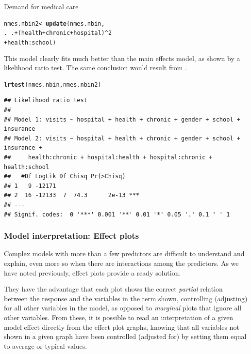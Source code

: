 \documentclass[11pt]{book}\usepackage[]{graphicx}\usepackage[]{color}
\makeatletter
\newcommand{\hlnum}[1]{\textcolor[rgb]{0.686,0.059,0.569}{#1}}%
\newcommand{\hlopt}[1]{\textcolor[rgb]{0,0,0}{#1}}%
\newcommand{\hlstd}[1]{\textcolor[rgb]{0.345,0.345,0.345}{#1}}%
\newcommand{\hlkwb}[1]{\textcolor[rgb]{0.69,0.353,0.396}{#1}}%
\newcommand{\hlkwd}[1]{\textcolor[rgb]{0.737,0.353,0.396}{\textbf{#1}}}%
\newenvironment{kframe}{%
 \def\at@end@of@kframe{}%
 \ifinner\ifhmode%
  \def\at@end@of@kframe{\end{minipage}}%
  \begin{minipage}{\columnwidth}%
 \fi\fi%
 \def\FrameCommand##1{\hskip\@totalleftmargin \hskip-\fboxsep
 \colorbox{shadecolor}{##1}\hskip-\fboxsep
     \hskip-\linewidth \hskip-\@totalleftmargin \hskip\columnwidth}%
 \MakeFramed {\advance\hsize-\width
   \@totalleftmargin\z@ \linewidth\hsize
   \@setminipage}}%
 {\par\unskip\endMakeFramed%
 \at@end@of@kframe}
\newenvironment{knitrout}{}{} %
\renewenvironment{knitrout}{\small\renewcommand{\baselinestretch}{.85}}{} %
\makeatother
\begin{document}
\begin{Example}[nmes2]{Demand for medical care}
\begin{knitrout}
\color{fgcolor}\begin{kframe}
\begin{alltt}
\hlstd{nmes.nbin2} \hlkwb{<-} \hlkwd{update}\hlstd{(nmes.nbin,}
                     \hlstd{.} \hlopt{~} \hlstd{.} \hlopt{+} \hlstd{(health}\hlopt{+}\hlstd{chronic}\hlopt{+}\hlstd{hospital)}\hlopt{^}\hlnum{2}
                           \hlopt{+} \hlstd{health}\hlopt{:}\hlstd{school)}
\end{alltt}
\end{kframe}
\end{knitrout}
This model clearly fits much better than the main effects model, as
shown by a likelihood ratio test. The same
conclusion would result from .
\begin{knitrout}
\color{fgcolor}\begin{kframe}
\begin{alltt}
\hlkwd{lrtest}\hlstd{(nmes.nbin, nmes.nbin2)}
\end{alltt}
\begin{verbatim}
## Likelihood ratio test
## 
## Model 1: visits ~ hospital + health + chronic + gender + school + insurance
## Model 2: visits ~ hospital + health + chronic + gender + school + insurance + 
##     health:chronic + hospital:health + hospital:chronic + health:school
##   #Df LogLik Df Chisq Pr(>Chisq)    
## 1   9 -12171                        
## 2  16 -12133  7  74.3      2e-13 ***
## ---
## Signif. codes:  0 '***' 0.001 '**' 0.01 '*' 0.05 '.' 0.1 ' ' 1
\end{verbatim}
\end{kframe}
\end{knitrout}
\end{Example}

\subsubsection{Model interpretation: Effect plots}
Complex models with more than a few predictors are difficult to
understand and explain, even more so when there are interactions among
the predictors. As we have noted previously, effect plots \citep{Fox:87,FoxAndersen:2006}
provide a ready solution.

They have the advantage that each plot shows the correct \emph{partial}
relation between the response and the variables in the term shown,
controlling (adjusting) for all other variables in the model, as opposed
to \emph{marginal} plots that ignore all other variables.
From these, it is possible to read an interpretation of a given model
effect directly from the effect plot graphs, knowing that all variables
not shown in a given graph have been controlled (adjusted for) by setting them
equal to average or typical values.
\end{document}
